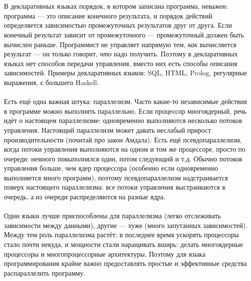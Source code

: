 \documentclass[11pt]{book}
\begin{document}
\begin{itemize}
    \\ \\
    В декларативных языках порядок, в котором записана программа, неважен:
    программа --- это описание конечного результата, и порядок действий определяется зависимостью
    промежуточных результатов друг от друга.
    Если конечный результат зависит от промежуточного --- промежуточный должен быть вычислен раньше.
    Программист не управляет напрямую тем, \emph{как} вычисляется результат --- он только говорит, \emph{что} надо получить.
    Поэтому в декларативных языках нет способов передачи управления, вместо них есть способы описания зависимостей.
    Примеры декларативных языков: SQL, HTML, Prolog, регулярные выражения, с большего Haskell.
    \\ \\
    Есть ещё одна важная штука: параллелизм.
    Часто какие-то независимые действия в программе можно выполнять параллельно.
    Если процессор многоядерный, речь идёт о настоящем параллелизме: одновременно выполняются несколько потоков управления.
    Настоящий параллелизм может давать неслабый прирост производительности (почитай про закон Амдала).
    Есть ещё псевдопараллелизм, когда потоки управления выполняются на одном и том же процессоре,
    просто по очереди: немного повыполнялся один, потом следующий и т.д.
    Обычно потоков управления больше, чем ядер процессора (особенно если одновременно выполняется много программ),
    поэтому псевдопараллелизм надстраивается поверх настоящего параллелизма:
    все потоки управления выстраиваются в очередь, а из очереди распределяются на разные ядра.
    \\ \\
    Одни языки лучше приспособлены для параллелизма (легко отслеживать зависимости между данными),
    другие --- хуже (много запутанных зависимостей).
    Между тем роль параллелизма растёт: в последнее время ускорять процессоры стало почти некуда,
    и мощности стали наращивать вширь: делать многоядерные процессоры и многопроцессорные архитектуры.
    Поэтому для языка программирования крайне важно предоставлять простые и эффективные средства распараллелить программу.


\end{itemize}
\end{document}
